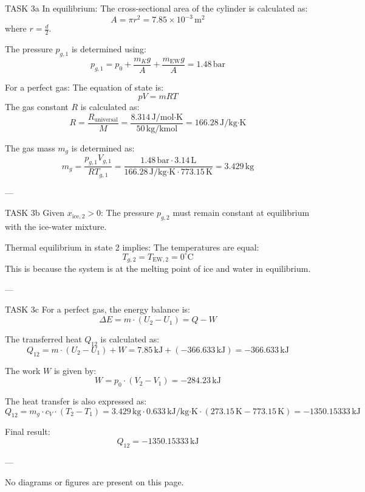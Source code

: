 TASK 3a  
In equilibrium:  
The cross-sectional area of the cylinder is calculated as:  
\[
A = \pi r^2 = 7.85 \times 10^{-3} \, \text{m}^2
\]  
where \( r = \frac{d}{2} \).  

The pressure \( p_{g,1} \) is determined using:  
\[
p_{g,1} = p_0 + \frac{m_K g}{A} + \frac{m_{\text{EW}} g}{A} = 1.48 \, \text{bar}
\]  

For a perfect gas:  
The equation of state is:  
\[
p V = m R T
\]  
The gas constant \( R \) is calculated as:  
\[
R = \frac{R_{\text{universal}}}{M} = \frac{8.314 \, \text{J/mol·K}}{50 \, \text{kg/kmol}} = 166.28 \, \text{J/kg·K}
\]  

The gas mass \( m_g \) is determined as:  
\[
m_g = \frac{p_{g,1} V_{g,1}}{R T_{g,1}} = \frac{1.48 \, \text{bar} \cdot 3.14 \, \text{L}}{166.28 \, \text{J/kg·K} \cdot 773.15 \, \text{K}} = 3.429 \, \text{kg}
\]  

---

TASK 3b  
Given \( x_{\text{ice},2} > 0 \):  
The pressure \( p_{g,2} \) must remain constant at equilibrium with the ice-water mixture.  

Thermal equilibrium in state 2 implies:  
The temperatures are equal:  
\[
T_{g,2} = T_{\text{EW},2} = 0^\circ\text{C}
\]  
This is because the system is at the melting point of ice and water in equilibrium.  

---

TASK 3c  
For a perfect gas, the energy balance is:  
\[
\Delta E = m \cdot (U_2 - U_1) = Q - W
\]  

The transferred heat \( Q_{12} \) is calculated as:  
\[
Q_{12} = m \cdot (U_2 - U_1) + W = 7.85 \, \text{kJ} + (-366.633 \, \text{kJ}) = -366.633 \, \text{kJ}
\]  

The work \( W \) is given by:  
\[
W = p_0 \cdot (V_2 - V_1) = -284.23 \, \text{kJ}
\]  

The heat transfer is also expressed as:  
\[
Q_{12} = m_g \cdot c_V \cdot (T_2 - T_1) = 3.429 \, \text{kg} \cdot 0.633 \, \text{kJ/kg·K} \cdot (273.15 \, \text{K} - 773.15 \, \text{K}) = -1350.15333 \, \text{kJ}
\]  

Final result:  
\[
Q_{12} = -1350.15333 \, \text{kJ}
\]  

---

No diagrams or figures are present on this page.